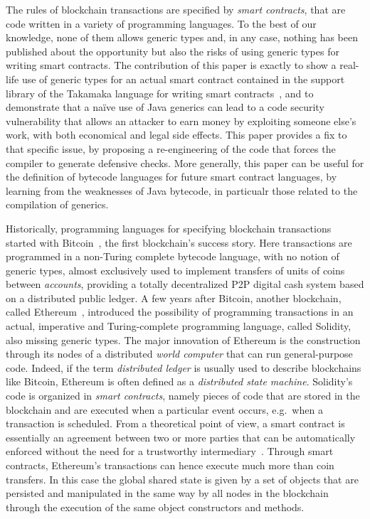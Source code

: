 The rules of blockchain transactions are specified by \emph{smart contracts},
that are code written in a variety of programming languages. To the best of our knowledge, none of them allows generic types and, in any case,
nothing has been published about the opportunity but also the risks of using generic types for writing smart contracts.
The contribution of this paper is exactly to show a real-life
use of generic types for an actual smart contract contained in the support
library of the Takamaka language for writing smart contracts~\cite{Spoto19,Spoto20},
and to demonstrate that a na\"{i}ve use
of Java generics can lead to a code security vulnerability that
allows an attacker to earn money by exploiting someone else's work, with both economical and legal side effects.
This paper provides a fix to that specific issue,
by proposing a re-engineering of the code that forces the compiler to generate defensive checks.
More generally, this paper can be useful for the definition of
bytecode languages for future smart contract languages, by
learning from the weaknesses of Java bytecode, in particualr those related to the
compilation of generics.

Historically, programming languages for specifying blockchain transactions started with
Bitcoin~\cite{Nakamoto08,book-mastering-bitcoin}, the first blockchain's success story. Here transactions are programmed in a non-Turing complete bytecode language, with no notion of generic types, almost exclusively used to implement transfers of units of coins between \emph{accounts}, providing a totally decentralized P2P digital cash system based on a distributed public ledger. 
%
A few years after Bitcoin, another blockchain, called Ethereum~\cite{Buterin13,AntonopoulosW18}, introduced the possibility of programming transactions in an actual, imperative and Turing-complete programming language, called Solidity, also missing generic types. The major innovation of Ethereum is the construction through its nodes of a distributed \emph{world computer} that can run general-purpose code. Indeed, if the term \emph{distributed ledger} is usually used to describe blockchains like Bitcoin, Ethereum is often defined as a \emph{distributed state machine}. Solidity's code is organized in \emph{smart contracts}, namely pieces of code that are stored in the blockchain and are executed when a particular event occurs, e.g.\ when a transaction is scheduled. From a theoretical point of view, a smart contract is essentially an agreement between two or more parties that can be automatically enforced without the need for a trustworthy intermediary~\cite{ebp}. Through smart contracts, Ethereum's transactions can hence execute much more than coin transfers. In this case the global shared state is given by a set of objects that are persisted and manipulated in the same way by all nodes in the blockchain through the execution of the same object constructors and methods.

